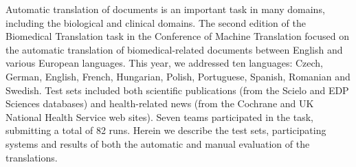 Automatic translation of documents is an important task in many domains, including the biological and clinical domains. The second edition of the Biomedical Translation task in the Conference of Machine Translation focused on the automatic translation of biomedical-related documents between English and various European languages. This year, we addressed ten languages: Czech, German, English, French, Hungarian, Polish, Portuguese, Spanish, Romanian and Swedish. Test sets included both scientific publications (from the Scielo and EDP Sciences databases) and health-related news (from the Cochrane and UK National Health Service web sites). Seven teams participated in the task, submitting a total of 82 runs. Herein we describe the test sets, participating systems and results of both the automatic and manual evaluation of the translations.
